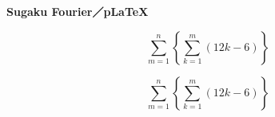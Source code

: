 \documentclass[dvipdfmx]{jsarticle}
\newcommand{\CompactSugakuSum}[2]{%
  \mathop{\textstyle\sum}\limits_{#1}^{#2}%
}
\begin{document}
\begin{center}
  \textbf{Sugaku Fourier／p\LaTeX}
\end{center}

\[
  \CompactSugakuSum{m=1}{n}
  \left\{
    \CompactSugakuSum{k=1}{m}(12k-6)
  \right\}
\]

\[
  \sum_{m=1}^{n}
  \left\{
    \sum_{k=1}^{m}(12k-6)
  \right\}
\]
\end{document}
